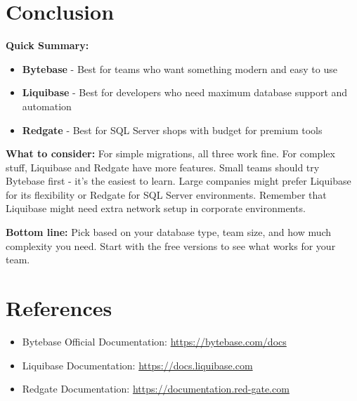 \documentclass[11pt,a4paper]{article}
\begin{document}
\newpage
\section{Conclusion}

\textbf{Quick Summary:}

\begin{itemize}
    \item \textbf{Bytebase} - Best for teams who want something modern and easy to use
    \item \textbf{Liquibase} - Best for developers who need maximum database support and automation
    \item \textbf{Redgate} - Best for SQL Server shops with budget for premium tools
\end{itemize}

\textbf{What to consider:} For simple migrations, all three work fine. For complex stuff, Liquibase and Redgate have more features. Small teams should try Bytebase first - it's the easiest to learn. Large companies might prefer Liquibase for its flexibility or Redgate for SQL Server environments. Remember that Liquibase might need extra network setup in corporate environments.

\textbf{Bottom line:} Pick based on your database type, team size, and how much complexity you need. Start with the free versions to see what works for your team.

\newpage
\section{References}

\begin{itemize}
    \item Bytebase Official Documentation: \url{https://bytebase.com/docs}
    \item Liquibase Documentation: \url{https://docs.liquibase.com}
    \item Redgate Documentation: \url{https://documentation.red-gate.com}
\end{itemize}
\end{document}
